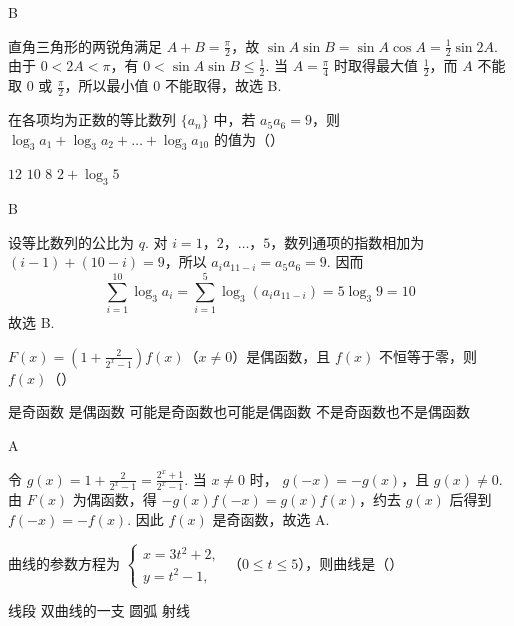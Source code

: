 \documentclass[UTF8,a4paper,oneside,11pt]{ctexbook}
\begin{document}
\begin{answer}
B
\end{answer}

\begin{solution}
直角三角形的两锐角满足 \(A+B=\frac{\pi}{2}\)，故
\(\sin A\sin B=\sin A\cos A=\frac{1}{2}\sin 2A\). 由于
\(0<2A<\pi\)，有 \(0<\sin A\sin B\leqslant\frac{1}{2}\). 当
\(A=\frac{\pi}{4}\) 时取得最大值 \(\frac{1}{2}\)，而 \(A\) 不能取 \(0\) 或
\(\frac{\pi}{2}\)，所以最小值 \(0\) 不能取得，故选 B.
\end{solution}

\begin{problem}
在各项均为正数的等比数列 \(\{a_{n}\}\) 中，若 \(a_{5}a_{6} = 9\)，则 \(\log_{3} a_{1} + \log_{3} a_{2} + \dots + \log_{3} a_{10}\) 的值为（\quad）

\choices
    {\(12\)}
    {\(10\)}
    {\(8\)}
    {\(2 + \log_{3} 5\)}
\end{problem}

\begin{answer}
B
\end{answer}

\begin{solution}
设等比数列的公比为 \(q\). 对 \(i=1\)，\(2\)，\(\dots\)，\(5\)，数列通项的指数相加为
\((i-1)+(10-i)=9\)，所以
\(a_i a_{11-i}=a_5a_6=9\). 因而
\[
\sum_{i=1}^{10}\log_3 a_i
=\sum_{i=1}^{5}\log_3(a_i a_{11-i})
=5\log_3 9=10
\]
故选 B.
\end{solution}

\begin{problem}
\(F(x) = \left(1 + \frac{2}{2^{x} - 1}\right)f(x)\)（\(x \neq 0\)）是偶函数，且 \(f(x)\) 不恒等于零，则 \(f(x)\)（\quad）

\choices
    {是奇函数}
    {是偶函数}
    {可能是奇函数也可能是偶函数}
    {不是奇函数也不是偶函数}
\end{problem}

\begin{answer}
A
\end{answer}

\begin{solution}
令
\(g(x)=1+\frac{2}{2^x-1}=\frac{2^x+1}{2^x-1}\). 当 \(x\neq0\) 时，
\(g(-x)=-g(x)\)，且 \(g(x)\neq0\). 由 \(F(x)\) 为偶函数，得
\(-g(x)f(-x)=g(x)f(x)\)，约去 \(g(x)\) 后得到
\(f(-x)=-f(x)\). 因此 \(f(x)\) 是奇函数，故选 A.
\end{solution}

\begin{problem}
曲线的参数方程为 \(\begin{cases}
x = 3t^2 + 2,\\
y = t^2 - 1,
\end{cases}\) （\(0 \leqslant t \leqslant 5\)），则曲线是（\quad）

\choices
    {线段}
    {双曲线的一支}
    {圆弧}
    {射线}
\end{problem}
\end{document}
